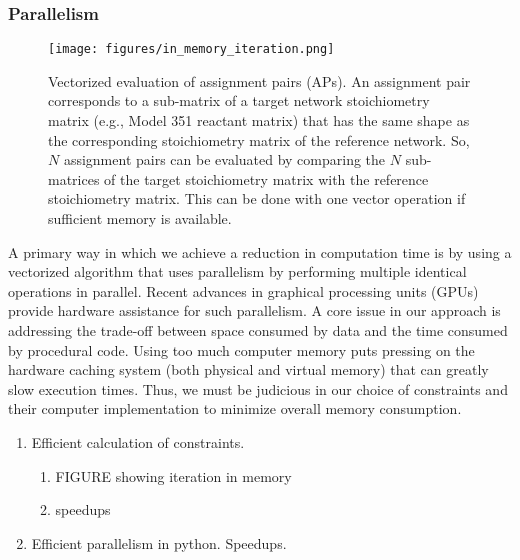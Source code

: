 \documentclass{article}
\begin{document}
\subsubsection{Parallelism}

\begin{figure}[!tpb]%
    

    \centering
    \texttt{[image: figures/in\_memory\_iteration.png]}
    \caption{Vectorized evaluation of assignment pairs (APs). An assignment pair corresponds to a sub-matrix of a target network stoichiometry matrix (e.g., Model 351 reactant matrix) that has the same shape as the corresponding stoichiometry matrix of the reference network. So, $N$ assignment pairs can be evaluated by comparing the $N$ sub-matrices of the target stoichiometry matrix with the reference stoichiometry matrix. This can be done with one vector operation if sufficient memory is available.
    }
    \label{fig:vectorization}
\end{figure}

A primary way in which we achieve a reduction in computation time
is by using a vectorized algorithm that uses parallelism by performing multiple identical operations in parallel. Recent advances in graphical processing units (GPUs) provide hardware assistance for such parallelism.
A core issue in our approach is addressing the trade-off between space consumed by data and the time consumed by procedural code. Using too much computer memory puts pressing on the hardware caching system (both physical and virtual memory) that can greatly slow execution times. Thus, we must be judicious in our choice of constraints and their computer implementation to minimize overall memory consumption.

\begin{enumerate}
    \item Efficient calculation of constraints.
    \begin{enumerate}
        \item FIGURE showing iteration in memory
        \item speedups
    \end{enumerate}
    \item Efficient parallelism in python. Speedups.
\end{enumerate}

\end{document}
